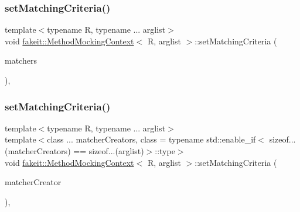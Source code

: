 \mbox{\label{classfakeit_1_1MethodMockingContext_affc5ac50fc419a5f8b5adff8d5d02941}} 
\subsubsection{\texorpdfstring{setMatchingCriteria()}{setMatchingCriteria()}\hspace{0.1cm}{\footnotesize\ttfamily [9/27]}}
{\footnotesize\ttfamily template$<$typename R, typename ... arglist$>$ \\
void \mbox{\hyperlink{classfakeit_1_1MethodMockingContext}{fakeit\+::\+Method\+Mocking\+Context}}$<$ R, arglist $>$\+::set\+Matching\+Criteria (\begin{DoxyParamCaption}\item[{const std\+::vector$<$ \mbox{\hyperlink{classfakeit_1_1Destructible}{Destructible}} $\ast$ $>$ \&}]{matchers }\end{DoxyParamCaption})\hspace{0.3cm}{\ttfamily [inline]}, {\ttfamily [protected]}}

\mbox{\label{classfakeit_1_1MethodMockingContext_ab6bf85e9f9f5e5eeb2766ec487a42e20}} 
\subsubsection{\texorpdfstring{setMatchingCriteria()}{setMatchingCriteria()}\hspace{0.1cm}{\footnotesize\ttfamily [10/27]}}
{\footnotesize\ttfamily template$<$typename R, typename ... arglist$>$ \\
template$<$class ... matcher\+Creators, class  = typename std\+::enable\+\_\+if$<$                sizeof...(matcher\+Creators) == sizeof...(arglist)$>$\+::type$>$ \\
void \mbox{\hyperlink{classfakeit_1_1MethodMockingContext}{fakeit\+::\+Method\+Mocking\+Context}}$<$ R, arglist $>$\+::set\+Matching\+Criteria (\begin{DoxyParamCaption}\item[{const matcher\+Creators \&...}]{matcher\+Creator }\end{DoxyParamCaption})\hspace{0.3cm}{\ttfamily [inline]}, {\ttfamily [protected]}}

